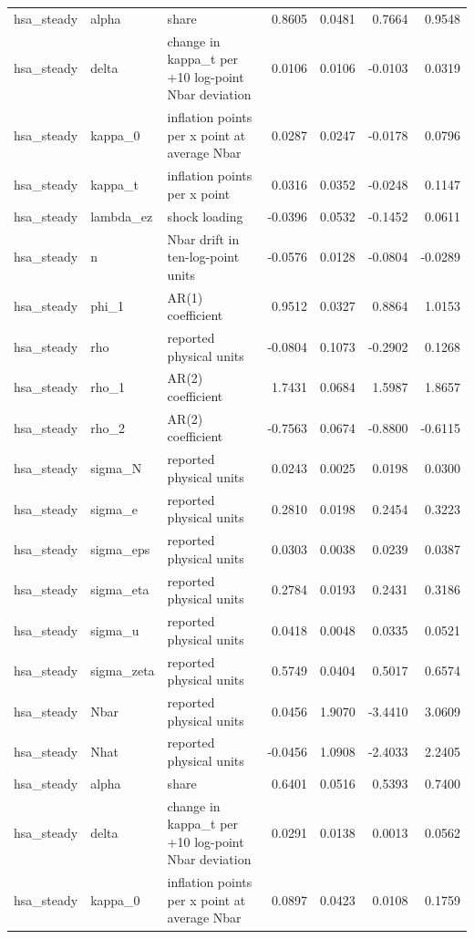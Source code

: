 \begin{tabular}{lllrrrr}
hsa\_steady & alpha & share & 0.8605 & 0.0481 & 0.7664 & 0.9548 \\
hsa\_steady & delta & change in kappa\_t per +10 log-point Nbar deviation & 0.0106 & 0.0106 & -0.0103 & 0.0319 \\
hsa\_steady & kappa\_0 & inflation points per x point at average Nbar & 0.0287 & 0.0247 & -0.0178 & 0.0796 \\
hsa\_steady & kappa\_t & inflation points per x point & 0.0316 & 0.0352 & -0.0248 & 0.1147 \\
hsa\_steady & lambda\_ez & shock loading & -0.0396 & 0.0532 & -0.1452 & 0.0611 \\
hsa\_steady & n & Nbar drift in ten-log-point units & -0.0576 & 0.0128 & -0.0804 & -0.0289 \\
hsa\_steady & phi\_1 & AR(1) coefficient & 0.9512 & 0.0327 & 0.8864 & 1.0153 \\
hsa\_steady & rho & reported physical units & -0.0804 & 0.1073 & -0.2902 & 0.1268 \\
hsa\_steady & rho\_1 & AR(2) coefficient & 1.7431 & 0.0684 & 1.5987 & 1.8657 \\
hsa\_steady & rho\_2 & AR(2) coefficient & -0.7563 & 0.0674 & -0.8800 & -0.6115 \\
hsa\_steady & sigma\_N & reported physical units & 0.0243 & 0.0025 & 0.0198 & 0.0300 \\
hsa\_steady & sigma\_e & reported physical units & 0.2810 & 0.0198 & 0.2454 & 0.3223 \\
hsa\_steady & sigma\_eps & reported physical units & 0.0303 & 0.0038 & 0.0239 & 0.0387 \\
hsa\_steady & sigma\_eta & reported physical units & 0.2784 & 0.0193 & 0.2431 & 0.3186 \\
hsa\_steady & sigma\_u & reported physical units & 0.0418 & 0.0048 & 0.0335 & 0.0521 \\
hsa\_steady & sigma\_zeta & reported physical units & 0.5749 & 0.0404 & 0.5017 & 0.6574 \\
hsa\_steady & Nbar & reported physical units & 0.0456 & 1.9070 & -3.4410 & 3.0609 \\
hsa\_steady & Nhat & reported physical units & -0.0456 & 1.0908 & -2.4033 & 2.2405 \\
hsa\_steady & alpha & share & 0.6401 & 0.0516 & 0.5393 & 0.7400 \\
hsa\_steady & delta & change in kappa\_t per +10 log-point Nbar deviation & 0.0291 & 0.0138 & 0.0013 & 0.0562 \\
hsa\_steady & kappa\_0 & inflation points per x point at average Nbar & 0.0897 & 0.0423 & 0.0108 & 0.1759 \\

\end{tabular}
